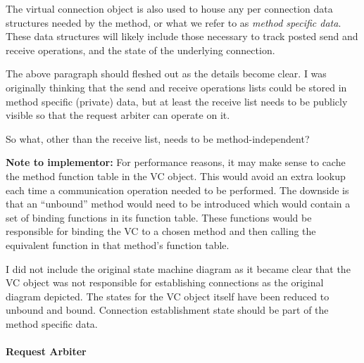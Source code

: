 The virtual connection object is also used to house any per connection data
structures needed by the method, or what we refer to as \emph{method specific
  data}.  These data structures will likely include those necessary to track
posted send and receive operations, and the state of the underlying connection.

\begin{cmt}[BRT]
  The above paragraph should fleshed out as the details become clear. I was
  originally thinking that the send and receive operations lists could be
  stored in method specific (private) data, but at least the receive list needs
  to be publicly visible so that the request arbiter can operate on it.
\end{cmt}

\begin{cmt}[ROB]
  So what, other than the receive list, needs to be method-independent?
\end{cmt}

\textbf{Note to implementor:} For performance reasons, it may make sense to
cache the method function table in the VC object.  This would avoid an extra
lookup each time a communication operation needed to be performed.  The
downside is that an ``unbound'' method would need to be introduced which would
contain a set of binding functions in its function table.  These functions
would be responsible for binding the VC to a chosen method and then calling the
equivalent function in that method's function table.

\begin{cmt}[BRT]
  I did not include the original state machine diagram as it became clear that
  the VC object was not responsible for establishing connections as the
  original diagram depicted.  The states for the VC object itself have been
  reduced to unbound and bound.  Connection establishment state should be part
  of the method specific data.
\end{cmt}


\paragraph{Request Arbiter}

%

